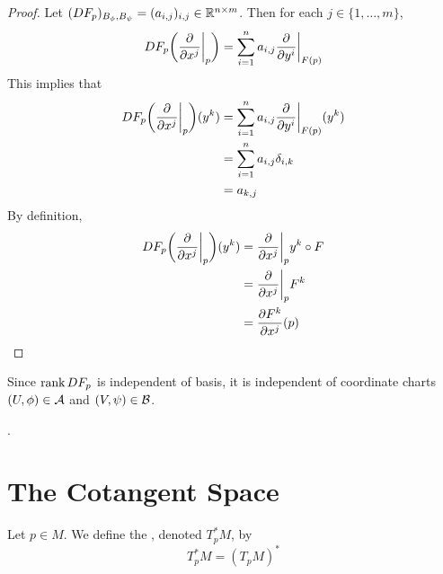 \documentclass{book}
\begin{document}
	\begin{proof}
		Let $(DF_p)_{B_\phi, B_{\psi}} = (a_{i,j})_{i,j} \in \mathbb{R}^{n \times m}$. Then for each $j \in \{1, \dots, m\}$, $$DF_p \bigg(\frac{\partial }{\partial x^j} \bigg|_p\bigg) = \sum_{i=1}^n a_{i,j}\frac{\partial }{\partial y^i} \bigg|_{F(p)}$$
		This implies that 
		\begin{align*}
			DF_p \bigg(\frac{\partial }{\partial x^j} \bigg|_p\bigg) (y^k )
			&=   \sum_{i=1}^n a_{i,j}\frac{\partial }{\partial y^i} \bigg|_{F(p)} (y^k) \\
			&= \sum_{i=1}^n a_{i,j} \delta_{i,k} \\
			&= a_{k, j}
		\end{align*}
		By definition, 
		\begin{align*}
			DF_p \bigg(\frac{\partial }{\partial x^j} \bigg|_p\bigg) (y^k )
			&=  \frac{\partial }{\partial x^j} \bigg|_p y^k \circ F \\
			&= \frac{\partial }{\partial x^j} \bigg|_p F^k \\
			&= \frac{\partial F^k}{\partial x^j} (p)
		\end{align*}
	\end{proof}
	
	
	\begin{note}
	Since $\operatorname{\text{rank}} DF_p$ is independent of basis, it is independent of coordinate charts $(U, \phi) \in \mathcal{A}$ and $(V, \psi) \in \mathcal{B}$. 
	\end{note}	

	\begin{ex}
		.
	\end{ex}
	
	
	
	\begin{ex}
		
	\end{ex}

	
	



	
	
	
	
	
	
	
	
	
	
	
	
	
	
	\newpage
	\section{The Cotangent Space}	
	
	
	\begin{defn}
	Let $p \in M$. We define the , denoted $T^*_pM$, by $$T^*_pM = (T_pM)^*$$
	\end{defn}
	
\end{document}
